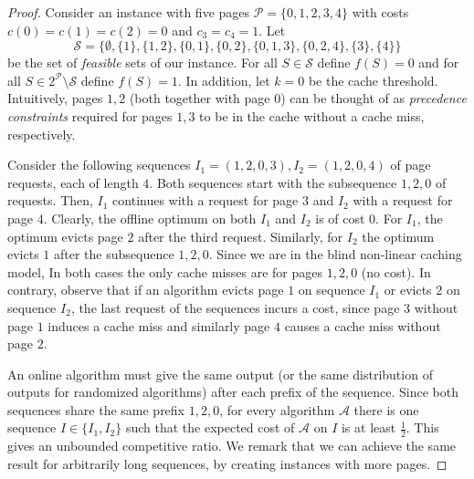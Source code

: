 \documentclass[11pt]{article}
\newcommand{\cA}{{\mathcal{A}}}
\newcommand{\cP}{{\mathcal{P}}}
\newcommand{\cS}{{\mathcal{S}}}
\begin{document}
{\begin{proof}
	Consider an instance with five pages $\cP = \{0,1,2,3,4\}$ with costs $c(0) = c(1) = c(2) = 0$ and $c_3 = c_4 = 1$. %
	Let $$\cS = \big\{\emptyset,\{1\},\{1,2\}, \{0,1\}, \{0,2\}, \{0,1,3\},\{0,2,4\}, \{3\},\{4\} \big\}$$
	be the set of {\em feasible} sets of our instance. For all $S \in \cS$ define $f(S) = 0$ and for all $S \in 2^{\cP} \setminus \cS$ define $f(S) = 1$. In addition, let $k = 0$ be the cache threshold.  
 Intuitively, pages $1,2$ (both together with page $0$) can be thought of as {\em precedence constraints} required for pages $1,3$ to be in the cache without a cache miss, respectively. 
 
 Consider the following sequences $I_1 = (1,2,0,3),I_2 = (1,2,0,4)$ of page requests, each of length $4$. Both sequences start with the subsequence $1,2,0$ of requests. %
 Then, $I_1$ continues with a request for page $3$ and $I_2$ with a request for page $4$. Clearly, the offline optimum on both $I_1$ and $I_2$ is of cost $0$.  For $I_1$, the optimum evicts page $2$ after the third request. Similarly, for $I_2$ the optimum evicts $1$ after the subsequence $1,2,0$. Since we are in the blind non-linear caching model, In both cases the only cache misses are for pages $1,2,0$ (no cost).  In contrary, observe that if an algorithm evicts page $1$ on sequence $I_1$ or evicts $2$ on sequence $I_2$, the last request of the sequences incurs a cost, since page $3$ without page $1$ induces a cache miss and similarly page $4$ causes a cache miss without page $2$. %
 
 An online algorithm must give the same output (or the same distribution of outputs for randomized algorithms) after each prefix of the sequence. Since both sequences share the same prefix $1,2,0$, for every algorithm $\cA$ there is one sequence $I \in \{I_1,I_2\}$ such that the expected cost of $\cA$ on $I$ is at least $\frac{1}{2}$. This gives an unbounded competitive ratio. We remark that we can achieve the same result for arbitrarily long sequences, by creating instances with more pages. %
\end{proof}

}
\end{document}
